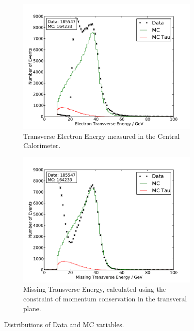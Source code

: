 \documentclass[
	paper=A4,
	parskip=full,
	chapterprefix=true,
	11pt,
	headings=normal,
	bibliography=totoc,
	listof=totoc,
	titlepage=on,
]{scrreprt}
\begin{document}
\begin{figure}%
	\centering
	\begin{subfigure}{0.45\textwidth}
		\includegraphics{nocuts/E_T_el}
		\caption{Transverse Electron Energy measured in the Central Calorimeter.}
	\end{subfigure}
	\begin{subfigure}{0.45\textwidth}
		\includegraphics{nocuts/E_T_miss}
		\caption{Missing Transverse Energy, calculated using the constraint of momentum conservation in the transveral plane.}
	\end{subfigure}
	\caption{Distributions of Data and MC variables.}
	\label{fig:no_cuts_Etmet}
\end{figure}
\end{document}
